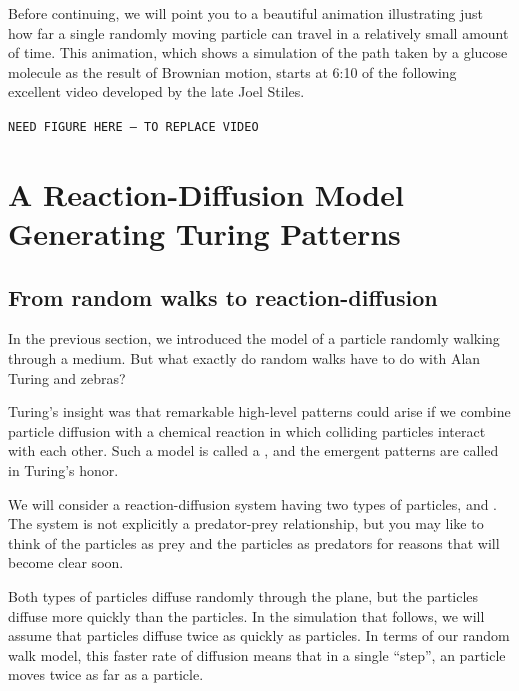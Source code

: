 Before continuing, we will point you to a beautiful animation illustrating just how far a single randomly moving particle can travel in a relatively small amount of time. This animation, which shows a simulation of the path taken by a glucose molecule as the result of Brownian motion, starts at 6:10 of the following excellent video developed by the late Joel Stiles.

\texttt{NEED FIGURE HERE -- TO REPLACE VIDEO}\\

















\FloatBarrier
{}

\section{A Reaction-Diffusion Model Generating Turing Patterns}
\label{sec:a_reaction-diffusion_model_generating_turing_patterns}

\subsection{From random walks to reaction-diffusion}

In the previous section, we introduced the model of a particle randomly walking through a medium. But what exactly do random walks have to do with Alan Turing and zebras?

Turing's insight was that remarkable high-level patterns could arise if we combine particle diffusion with a chemical reaction in which colliding particles interact with each other. Such a model is called a , and the emergent patterns are called  in Turing's honor.

We will consider a reaction-diffusion system having two types of particles,  and . The system is not explicitly a predator-prey relationship, but you may like to think of the  particles as prey and the  particles as predators for reasons that will become clear soon.

Both types of particles diffuse randomly through the plane, but the  particles diffuse more quickly than the  particles.  In the simulation that follows, we will assume that  particles diffuse twice as quickly as  particles. In terms of our random walk model, this faster rate of diffusion means that in a single ``step'', an  particle moves twice as far as a  particle.

